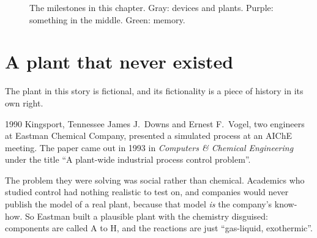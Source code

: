 \begin{figure}[htbp]
\centering
{}
\caption{The milestones in this chapter. Gray: devices and plants. Purple:
something in the middle. Green: memory.}
\end{figure}

\section{A plant that never existed}

The plant in this story is fictional, and its fictionality is a piece of history
in its own right.

\begin{history}{1990 \textperiodcentered{} Kingsport, Tennessee}
James J.\ Downs and Ernest F.\ Vogel, two engineers at Eastman Chemical Company,
presented a simulated process at an AIChE meeting. The paper came out in 1993 in
\emph{Computers \& Chemical Engineering} under the title ``A plant-wide
industrial process control problem''.

The problem they were solving was social rather than chemical. Academics who
studied control had nothing realistic to test on, and companies would never
publish the model of a real plant, because that model \emph{is} the company's
know-how. So Eastman built a plausible plant with the chemistry disguised:
components are called A to H, and the reactions are just ``gas-liquid,
exothermic''.
\end{history}

